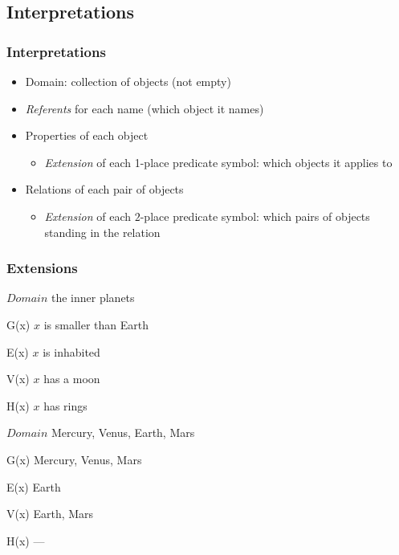 \subsection{Interpretations}

\begin{frame}
\frametitle{Interpretations}

\begin{itemize}[<+->]
\item Domain: collection of objects (not empty)
\item \emph{Referents} for each name (which object it names)
\item Properties of each object
  \begin{itemize}
  \item \emph{Extension} of each 1-place predicate symbol: which
  objects it applies to
  \end{itemize}
\item Relations of each pair of objects
\begin{itemize}
\item \emph{Extension} of each $2$-place predicate symbol: which pairs of
  objects standing in the relation
\end{itemize}
\end{itemize}

\end{frame}

\begin{frame}
\frametitle{Extensions}

\begin{ekey}
  \item[$Domain$] the inner planets
  \item[G(x)] $x$ is smaller than Earth
  \item[E(x)] $x$ is inhabited
  \item[V(x)] $x$ has a moon
  \item[H(x)] $x$ has rings
\end{ekey}

\begin{ekey}
\item[$Domain$] Mercury, Venus, Earth, Mars
\item[G(x)] Mercury, Venus, Mars
\item[E(x)] Earth
\item[V(x)] Earth, Mars
\item[H(x)] ---
\end{ekey}
\end{frame}


